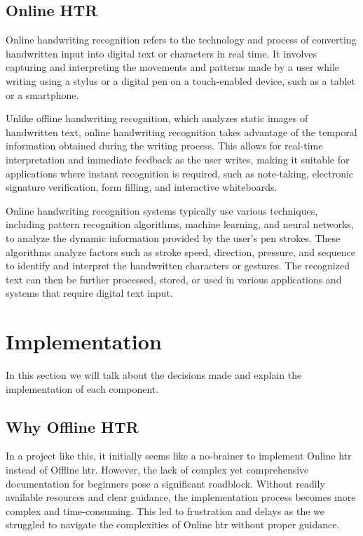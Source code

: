 \subsection{Online HTR}
Online handwriting recognition refers to the technology and process of converting handwritten input into digital text or characters in real time. It involves capturing and interpreting the movements and patterns made by a user while writing using a stylus or a digital pen on a touch-enabled device, such as a tablet or a smartphone.

Unlike offline handwriting recognition, which analyzes static images of handwritten text, online handwriting recognition takes advantage of the temporal information obtained during the writing process. This allows for real-time interpretation and immediate feedback as the user writes, making it suitable for applications where instant recognition is required, such as note-taking, electronic signature verification, form filling, and interactive whiteboards.

Online handwriting recognition systems typically use various techniques, including pattern recognition algorithms, machine learning, and neural networks, to analyze the dynamic information provided by the user's pen strokes. These algorithms analyze factors such as stroke speed, direction, pressure, and sequence to identify and interpret the handwritten characters or gestures. The recognized text can then be further processed, stored, or used in various applications and systems that require digital text input.


\section{Implementation}
In this section we will talk about the decisions made and explain the implementation of each component.
\subsection{Why Offline HTR}
In a project like this, it initially seems like a no-brainer to implement Online \gls{htr} instead of Offline \gls{htr}. However, the lack of complex yet comprehensive documentation for beginners pose a significant roadblock. Without readily available resources and clear guidance, the implementation process becomes more complex and time-consuming. This led to frustration and delays as the we struggled to navigate the complexities of Online \gls{htr} without proper guidance.

